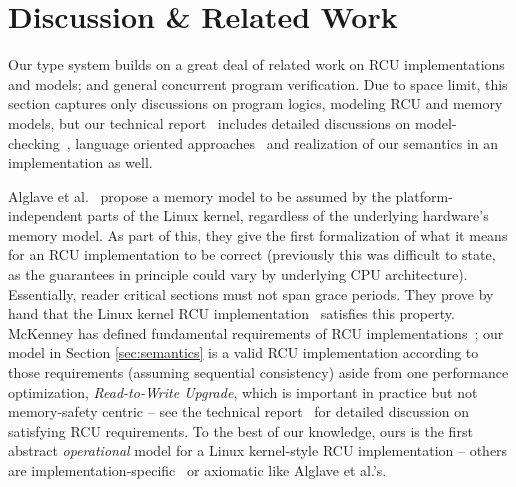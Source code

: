 \section{Discussion \& Related Work}
\label{sec:relatedwork}
Our type system builds on a great deal of related work on RCU implementations and models; and general concurrent program verification. Due to space limit, this section captures only discussions on program logics, modeling RCU and memory models, but our technical report~\cite{isotek} includes detailed discussions on model-checking~\cite{Kokologiannakis:2017:SMC:3092282.3092287,LiangMKM16,urcu_ieee}, language oriented approaches~\cite{Howard:2011:RES:2001252.2001267,Cooper2015RelativisticPI,Howard:2011:RES:2001252.2001267} and realization of our semantics in an implementation as well.

Alglave et al.~\cite{Alglave:2018:FSC:3173162.3177156} propose a memory model to be assumed by the platform-independent parts of the Linux kernel, regardless of the underlying hardware's memory model.
As part of this, they give the first formalization of what it means for an RCU implementation to be correct (previously this was difficult to state, as the guarantees in principle could vary by underlying CPU architecture). Essentially, reader critical sections must not span grace periods. They prove by hand that the Linux kernel RCU implementation~\cite{DBLP:conf/cav/AlglaveKT13} satisfies this property. McKenney has defined fundamental requirements of \textsf{RCU} implementations~\cite{abssem}; our model in Section \ref{sec:semantics} is a valid RCU implementation according to those requirements (assuming sequential consistency) aside from one performance optimization, \textit{Read-to-Write Upgrade}, which is important in practice but not memory-safety centric -- see the technical report~\cite{isotek} for detailed discussion on satisfying RCU requirements. To the best of our knowledge, ours is the first abstract \emph{operational} model for a Linux kernel-style RCU implementation -- others are implementation-specific~\cite{Mandrykin:2016:TDV:3001219.3001297} or axiomatic like Alglave et al.'s.

